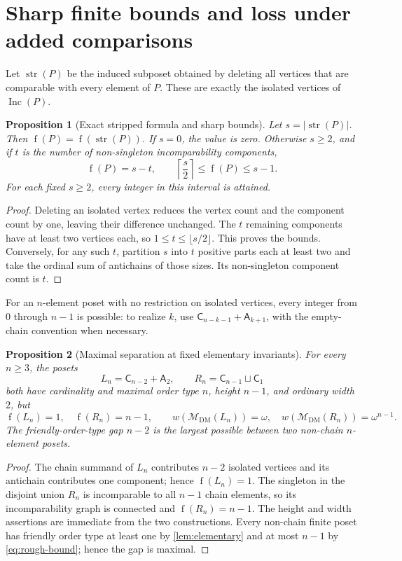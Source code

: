 \documentclass[11pt,letterpaper]{article}
\newtheorem{proposition}[proposition]{Proposition}
\theoremstyle{definition}
\theoremstyle{remark}
\newcommand{\fot}{\operatorname{f}}
\newcommand{\Inc}{\operatorname{Inc}}
\newcommand{\str}{\operatorname{str}}
\newcommand{\DM}{\mathrm{DM}}
\newcommand{\M}{\mathcal M}
\newcommand{\C}{\mathsf C}
\newcommand{\A}{\mathsf A}
\begin{document}
\section{Sharp finite bounds and loss under added comparisons}
\label{sec:bounds}
Let $\str(P)$ be the induced subposet obtained by deleting all vertices
that are comparable with every element of $P$. These are exactly the
isolated vertices of $\Inc(P)$.

\begin{proposition}[Exact stripped formula and sharp bounds]\label{prop:stripped}
Let $s=|\str(P)|$. Then $\fot(P)=\fot(\str(P))$. If $s=0$, the value is
zero. Otherwise $s\geq2$, and if $t$ is the number of non-singleton
incomparability components,
\[
 \fot(P)=s-t,\qquad
 \left\lceil\frac{s}{2}\right\rceil\leq\fot(P)\leq s-1.
\]
For each fixed $s\geq2$, every integer in this interval is attained.
\end{proposition}
\begin{proof}
Deleting an isolated vertex reduces the vertex count and the component
count by one, leaving their difference unchanged. The $t$ remaining
components have at least two vertices each, so $1\leq t\leq\lfloor s/2\rfloor$.
This proves the bounds. Conversely, for any such $t$, partition $s$ into
$t$ positive parts each at least two and take the ordinal sum of antichains
of those sizes. Its non-singleton component count is $t$.
\end{proof}

For an $n$-element poset with no restriction on isolated vertices, every
integer from $0$ through $n-1$ is possible: to realize $k$, use
$\C_{n-k-1}+\A_{k+1}$, with the empty-chain convention when necessary.

\begin{proposition}[Maximal separation at fixed elementary invariants]
For every $n\geq3$, the posets
\[
 L_n=\C_{n-2}+\A_2,
 \qquad R_n=\C_{n-1}\sqcup\C_1
\]
both have cardinality and maximal order type $n$, height $n-1$, and ordinary
width $2$, but
\[
 \fot(L_n)=1,\quad\fot(R_n)=n-1,
 \qquad
 w(\M_{\DM}(L_n))=\omega,\quad
 w(\M_{\DM}(R_n))=\omega^{n-1}.
\]
The friendly-order-type gap $n-2$ is the largest possible between two
non-chain $n$-element posets.
\end{proposition}
\begin{proof}
The chain summand of $L_n$ contributes $n-2$ isolated vertices and its
antichain contributes one component; hence $\fot(L_n)=1$. The singleton
in the disjoint union $R_n$ is incomparable to all $n-1$ chain elements,
so its incomparability graph is connected and $\fot(R_n)=n-1$.
The height and width assertions are immediate from the two constructions.
Every non-chain finite poset has friendly order type at least one by
\cref{lem:elementary} and at most $n-1$ by \eqref{eq:rough-bound}; hence
the gap is maximal.
\end{proof}
\end{document}

